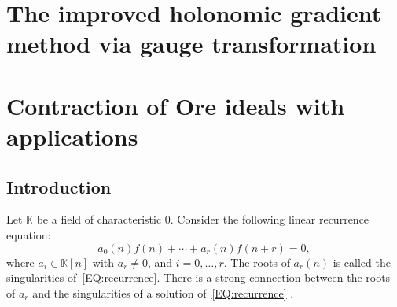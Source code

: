 \documentclass[10pt,a4paper]{article}
\newcommand{\bK}{ {\mathbb  K}}
\begin{document}

\section*{The improved holonomic gradient method via gauge transformation} \label{SECT:hgm}


\section{Contraction of Ore ideals with applications} \label{SECT:contraction}

\subsection{Introduction}
Let $\bK$ be a field of characteristic $0$. 
Consider the following linear recurrence equation:
\begin{equation} \label{EQ:recurrence}
 a_0(n)f(n) + \cdots + a_r(n)f(n+r)=0,
\end{equation}
where $a_i \in \bK[n]$ with $a_r \neq 0$, and $i = 0, \ldots, r$. The roots of $a_r(n)$ is called 
the singularities of~\eqref{EQ:recurrence}.  
There is a strong connection between the roots of $a_r$ 
and the singularities of a solution of~\eqref{EQ:recurrence} . 
\end{document}
